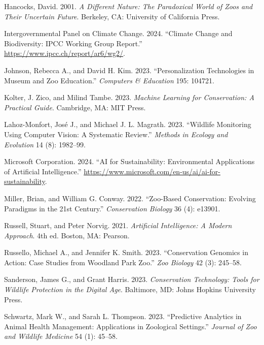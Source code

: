 \documentclass[
  Letterpaper,
]{scrbook}
\newlength{\cslhangindent}
\newenvironment{CSLReferences}[2] %
 {\begin{list}{}{%
  \setlength{\itemindent}{0pt}
  \setlength{\leftmargin}{0pt}
  \setlength{\parsep}{0pt}
  \ifodd #1
   \setlength{\leftmargin}{\cslhangindent}
   \setlength{\itemindent}{-1\cslhangindent}
  \fi
  \setlength{\itemsep}{#2\baselineskip}}}
 {\end{list}}
\begin{document}
\begin{CSLReferences}{1}{0}
Hancocks, David. 2001. \emph{A Different Nature: The Paradoxical World
of Zoos and Their Uncertain Future}. Berkeley, CA: University of
California Press.

Intergovernmental Panel on Climate Change. 2024. {``Climate Change and
Biodiversity: IPCC Working Group Report.''}
\url{https://www.ipcc.ch/report/ar6/wg2/}.

Johnson, Rebecca A., and David H. Kim. 2023. {``Personalization
Technologies in Museum and Zoo Education.''} \emph{Computers \&
Education} 195: 104721.

Kolter, J. Zico, and Milind Tambe. 2023. \emph{Machine Learning for
Conservation: A Practical Guide}. Cambridge, MA: MIT Press.

Lahoz-Monfort, José J., and Michael J. L. Magrath. 2023. {``Wildlife
Monitoring Using Computer Vision: A Systematic Review.''} \emph{Methods
in Ecology and Evolution} 14 (8): 1982--99.

Microsoft Corporation. 2024. {``AI for Sustainability: Environmental
Applications of Artificial Intelligence.''}
\url{https://www.microsoft.com/en-us/ai/ai-for-sustainability}.

Miller, Brian, and William G. Conway. 2022. {``Zoo-Based Conservation:
Evolving Paradigms in the 21st Century.''} \emph{Conservation Biology}
36 (4): e13901.

Russell, Stuart, and Peter Norvig. 2021. \emph{Artificial Intelligence:
A Modern Approach}. 4th ed. Boston, MA: Pearson.

Russello, Michael A., and Jennifer K. Smith. 2023. {``Conservation
Genomics in Action: Case Studies from Woodland Park Zoo.''} \emph{Zoo
Biology} 42 (3): 245--58.

Sanderson, James G., and Grant Harris. 2023. \emph{Conservation
Technology: Tools for Wildlife Protection in the Digital Age}.
Baltimore, MD: Johns Hopkins University Press.

Schwartz, Mark W., and Sarah L. Thompson. 2023. {``Predictive Analytics
in Animal Health Management: Applications in Zoological Settings.''}
\emph{Journal of Zoo and Wildlife Medicine} 54 (1): 45--58.


\end{CSLReferences}
\end{document}
